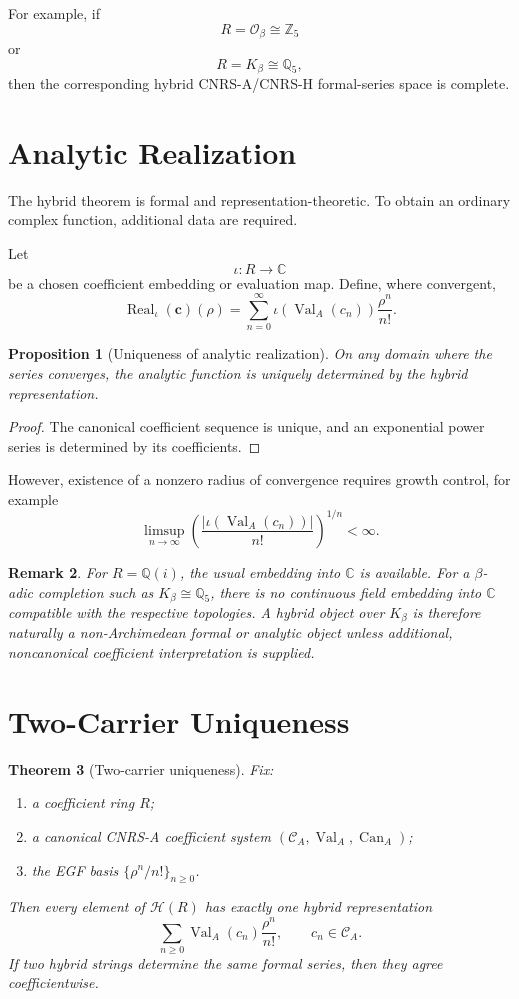 \documentclass[11pt]{article}
\newtheorem{theorem}{Theorem}[section]
\newtheorem{proposition}[theorem]{Proposition}
\newtheorem{remark}[theorem]{Remark}
\newcommand{\Z}{\mathbb Z}
\newcommand{\Q}{\mathbb Q}
\newcommand{\C}{\mathbb C}
\newcommand{\HR}{\mathcal H}
\newcommand{\CA}{\mathcal C_A}
\newcommand{\Val}{\operatorname{Val}_A}
\newcommand{\Can}{\operatorname{Can}_A}
\newcommand{\Real}{\operatorname{Real}}
\begin{document}
For example, if
\[
R=\mathcal O_\beta\cong\Z_5
\]
or
\[
R=K_\beta\cong\Q_5,
\]
then the corresponding hybrid CNRS-A/CNRS-H formal-series space is complete.

\section{Analytic Realization}

The hybrid theorem is formal and representation-theoretic.  To obtain an ordinary complex function, additional data are required.

Let
\[
\iota:R\to\C
\]
be a chosen coefficient embedding or evaluation map.  Define, where convergent,
\[
\Real_\iota(\mathbf c)(\rho)
=
\sum_{n=0}^{\infty}
\iota(\Val(c_n))
\frac{\rho^n}{n!}.
\]

\begin{proposition}[Uniqueness of analytic realization]
On any domain where the series converges, the analytic function is uniquely determined by the hybrid representation.
\end{proposition}

\begin{proof}
The canonical coefficient sequence is unique, and an exponential power series is determined by its coefficients.
\end{proof}

However, existence of a nonzero radius of convergence requires growth control, for example
\[
\limsup_{n\to\infty}
\left(
\frac{|\iota(\Val(c_n))|}{n!}
\right)^{1/n}
<\infty.
\]

\begin{remark}
For $R=\Q(i)$, the usual embedding into $\C$ is available.  For a $\beta$-adic completion such as $K_\beta\cong\Q_5$, there is no continuous field embedding into $\C$ compatible with the respective topologies.  A hybrid object over $K_\beta$ is therefore naturally a non-Archimedean formal or analytic object unless additional, noncanonical coefficient interpretation is supplied.
\end{remark}

\section{Two-Carrier Uniqueness}

\begin{theorem}[Two-carrier uniqueness]
Fix:
\begin{enumerate}[label=(\roman*)]
\item a coefficient ring $R$;
\item a canonical CNRS-A coefficient system $(\CA,\Val,\Can)$;
\item the EGF basis $\{\rho^n/n!\}_{n\ge0}$.
\end{enumerate}
Then every element of $\HR(R)$ has exactly one hybrid representation
\[
\sum_{n\ge0}
\Val(c_n)\frac{\rho^n}{n!},
\qquad c_n\in\CA.
\]
If two hybrid strings determine the same formal series, then they agree coefficientwise.
\end{theorem}
\end{document}
